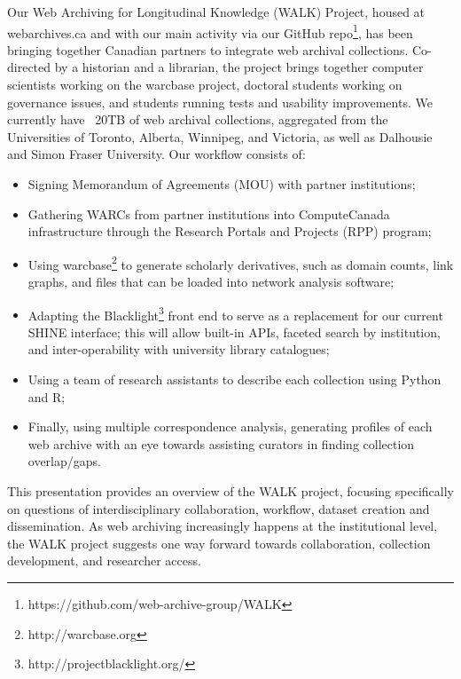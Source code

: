 \documentclass[sigconf]{acmart}
\begin{document}
Our Web Archiving for Longitudinal Knowledge (WALK) Project, housed at webarchives.ca and with our main activity via our GitHub repo\footnote{https://github.com/web-archive-group/WALK}, has been bringing together Canadian partners to integrate web archival collections. Co-directed by a historian and a librarian, the project brings together computer scientists working on the warcbase project, doctoral students working on governance issues, and students running tests and usability improvements. We currently have ~20TB of web archival collections, aggregated from the Universities of Toronto, Alberta, Winnipeg, and Victoria, as well as Dalhousie and Simon Fraser University. Our workflow consists of:
\begin{itemize}
  \item Signing Memorandum of Agreements (MOU) with partner institutions;
  \item Gathering WARCs from partner institutions into ComputeCanada infrastructure through the Research Portals and Projects (RPP) program;
  \item Using warcbase\footnote{http://warcbase.org} to generate scholarly derivatives, such as domain counts, link graphs, and files that can be loaded into network analysis software\cite{lin_etal_2017};
  \item Adapting the Blacklight\footnote{http://projectblacklight.org/} front end to serve as a replacement for our current SHINE interface; this will allow built-in APIs, faceted search by institution, and inter-operability with university library catalogues\cite{jackson_etal_2016};
  \item Using a team of research assistants to describe each collection using Python and R;
  \item Finally, using multiple correspondence analysis, generating profiles of each web archive with an eye towards assisting curators in finding collection overlap/gaps\cite{Milligan_etal_JCDL2016}.\\
\end{itemize}

This presentation provides an overview of the WALK project, focusing specifically on questions of interdisciplinary collaboration, workflow, dataset creation and dissemination. As web archiving increasingly happens at the institutional level, the WALK project suggests one way forward towards collaboration, collection development, and researcher access.


 
\end{document}
